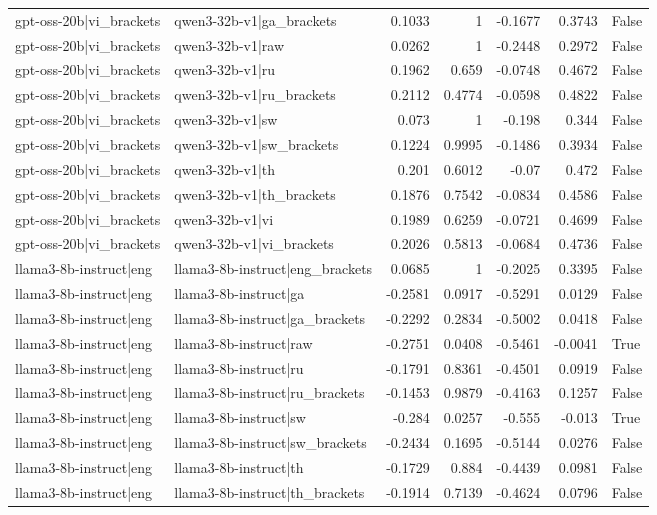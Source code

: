 \begin{table}
\begin{tabular}{l l r r r r l}
gpt-oss-20b|vi_brackets & qwen3-32b-v1|ga_brackets & 0.1033 & 1 & -0.1677 & 0.3743 & False \\
gpt-oss-20b|vi_brackets & qwen3-32b-v1|raw & 0.0262 & 1 & -0.2448 & 0.2972 & False \\
gpt-oss-20b|vi_brackets & qwen3-32b-v1|ru & 0.1962 & 0.659 & -0.0748 & 0.4672 & False \\
gpt-oss-20b|vi_brackets & qwen3-32b-v1|ru_brackets & 0.2112 & 0.4774 & -0.0598 & 0.4822 & False \\
gpt-oss-20b|vi_brackets & qwen3-32b-v1|sw & 0.073 & 1 & -0.198 & 0.344 & False \\
gpt-oss-20b|vi_brackets & qwen3-32b-v1|sw_brackets & 0.1224 & 0.9995 & -0.1486 & 0.3934 & False \\
gpt-oss-20b|vi_brackets & qwen3-32b-v1|th & 0.201 & 0.6012 & -0.07 & 0.472 & False \\
gpt-oss-20b|vi_brackets & qwen3-32b-v1|th_brackets & 0.1876 & 0.7542 & -0.0834 & 0.4586 & False \\
gpt-oss-20b|vi_brackets & qwen3-32b-v1|vi & 0.1989 & 0.6259 & -0.0721 & 0.4699 & False \\
gpt-oss-20b|vi_brackets & qwen3-32b-v1|vi_brackets & 0.2026 & 0.5813 & -0.0684 & 0.4736 & False \\
llama3-8b-instruct|eng & llama3-8b-instruct|eng_brackets & 0.0685 & 1 & -0.2025 & 0.3395 & False \\
llama3-8b-instruct|eng & llama3-8b-instruct|ga & -0.2581 & 0.0917 & -0.5291 & 0.0129 & False \\
llama3-8b-instruct|eng & llama3-8b-instruct|ga_brackets & -0.2292 & 0.2834 & -0.5002 & 0.0418 & False \\
llama3-8b-instruct|eng & llama3-8b-instruct|raw & -0.2751 & 0.0408 & -0.5461 & -0.0041 & True \\
llama3-8b-instruct|eng & llama3-8b-instruct|ru & -0.1791 & 0.8361 & -0.4501 & 0.0919 & False \\
llama3-8b-instruct|eng & llama3-8b-instruct|ru_brackets & -0.1453 & 0.9879 & -0.4163 & 0.1257 & False \\
llama3-8b-instruct|eng & llama3-8b-instruct|sw & -0.284 & 0.0257 & -0.555 & -0.013 & True \\
llama3-8b-instruct|eng & llama3-8b-instruct|sw_brackets & -0.2434 & 0.1695 & -0.5144 & 0.0276 & False \\
llama3-8b-instruct|eng & llama3-8b-instruct|th & -0.1729 & 0.884 & -0.4439 & 0.0981 & False \\
llama3-8b-instruct|eng & llama3-8b-instruct|th_brackets & -0.1914 & 0.7139 & -0.4624 & 0.0796 & False \\

\end{tabular}
\end{table}
